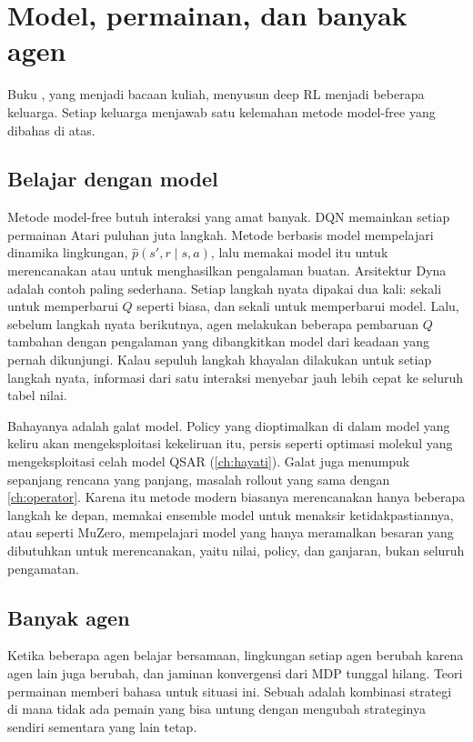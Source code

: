 \section{Model, permainan, dan banyak agen}

Buku \citet{plaat2022}, yang menjadi bacaan kuliah, menyusun deep RL menjadi beberapa keluarga. Setiap keluarga menjawab
satu kelemahan metode model-free yang dibahas di atas.

\subsection{Belajar dengan model}

Metode model-free butuh interaksi yang amat banyak. DQN memainkan setiap permainan Atari puluhan juta langkah. Metode berbasis
model mempelajari dinamika lingkungan, $\hat p(s',r\mid s,a)$, lalu memakai model itu untuk merencanakan atau untuk menghasilkan
pengalaman buatan. Arsitektur Dyna \citep{sutton1990} adalah contoh paling sederhana. Setiap langkah nyata dipakai dua kali:
sekali untuk memperbarui $Q$ seperti biasa, dan sekali untuk memperbarui model. Lalu, sebelum langkah nyata berikutnya, agen
melakukan beberapa pembaruan $Q$ tambahan dengan pengalaman yang dibangkitkan model dari keadaan yang pernah dikunjungi. Kalau
sepuluh langkah khayalan dilakukan untuk setiap langkah nyata, informasi dari satu interaksi menyebar jauh lebih cepat ke
seluruh tabel nilai.

Bahayanya adalah galat model. Policy yang dioptimalkan di dalam model yang keliru akan mengeksploitasi kekeliruan itu, persis
seperti optimasi molekul yang mengeksploitasi celah model QSAR (\cref{ch:hayati}). Galat juga menumpuk sepanjang rencana yang
panjang, masalah rollout yang sama dengan \cref{ch:operator}. Karena itu metode modern biasanya merencanakan hanya beberapa
langkah ke depan, memakai ensemble model untuk menaksir ketidakpastiannya, atau seperti MuZero, mempelajari model yang hanya
meramalkan besaran yang dibutuhkan untuk merencanakan, yaitu nilai, policy, dan ganjaran, bukan seluruh pengamatan.

\subsection{Banyak agen}

Ketika beberapa agen belajar bersamaan, lingkungan setiap agen berubah karena agen lain juga berubah, dan jaminan konvergensi
dari MDP tunggal hilang. Teori permainan memberi bahasa untuk situasi ini. Sebuah  adalah kombinasi
strategi di mana tidak ada pemain yang bisa untung dengan mengubah strateginya sendiri sementara yang lain tetap.

